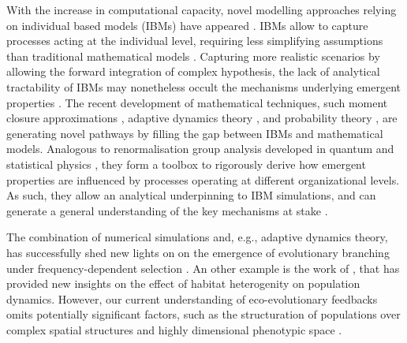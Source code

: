 With the increase in computational capacity, novel modelling approaches relying on individual based models (IBMs) have appeared \citep{deangelis2005individual}. IBMs allow to capture processes acting at the individual level, requiring less simplifying assumptions than traditional mathematical models \citep{deangelis2005individual}. Capturing more realistic scenarios by allowing the forward integration of complex hypothesis, the lack of analytical tractability of IBMs may nonetheless occult the mechanisms underlying emergent properties \citep{Lion2016,May2004}.
% 
The recent development of mathematical techniques, such moment closure approximations \citep{law1999moment,Gandhi2000,Nordbotten2020,Lion2016}, adaptive dynamics theory \citep{Metz1995}, and probability theory \citep{Champagnat2006}, are generating novel pathways by filling the gap between IBMs and mathematical models. 
% 
% 
Analogous to renormalisation group analysis developed in quantum and statistical physics \citep{Sayama}, they form a toolbox to rigorously derive how emergent properties are influenced by processes operating at different organizational levels. As such, they allow an analytical underpinning to IBM simulations, and can generate a general understanding of the key mechanisms at stake \citep{Lion2016}.

The combination of numerical simulations and, e.g., adaptive dynamics theory, has successfully shed new lights on on the emergence of evolutionary branching under frequency-dependent selection \citep{Dieckmann1999,Doebeli2003}.
%
An other example is the work of \citep{Meszena1997,Debarre2013a, Mirrahimi2020}, that has provided new insights on the effect of habitat heterogenity on population dynamics. 
% 
However, our current understanding of eco-evolutionary feedbacks omits potentially significant factors, such as the structuration of populations over complex spatial structures \citep{XX} and highly dimensional phenotypic space \citep{XXX}.

